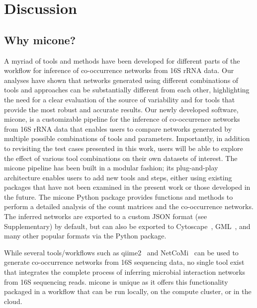 
\section*{Discussion}

  \subsection*{Why \ac{micone}?}

  A myriad of tools and methods have been developed for different parts of the workflow for inference of co-occurrence networks from 16S rRNA data.
  Our analyses have shown that networks generated using different combinations of tools and approaches can be substantially different from each other, highlighting the need for a clear evaluation of the source of variability and for tools that provide the most robust and accurate results.
  Our newly developed software, \ac{micone}, is a customizable pipeline for the inference of co-occurrence networks from 16S rRNA data that enables users to compare networks generated by multiple possible combinations of tools and parameters.
  Importantly, in addition to revisiting the test cases presented in this work, users will be able to explore the effect of various tool combinations on their own datasets of interest.
  The \ac{micone} pipeline has been built in a modular fashion; its plug-and-play architecture enables users to add new tools and steps, either using existing packages that have not been examined in the present work or those developed in the future.
  The \ac{micone} Python package provides functions and methods to perform a detailed analysis of the count matrices and the co-occurrence networks.
  The inferred networks are exported to a custom JSON format (see Supplementary) by default, but can also be exported to Cytoscape~\cite{shannonCytoscapeSoftwareEnvironment2003}, GML~\cite{himsoltGMLPortableGraph2010}, and many other popular formats via the Python package.

  While several tools/workflows such as \ac{qiime2}~\cite{bolyenReproducibleInteractiveScalable2019} and NetCoMi~\cite{peschelNetCoMiNetworkConstruction2020} can be used to generate co-occurrence networks from 16S sequencing data, no single tool exist that integrates the complete process of inferring microbial interaction networks from 16S sequencing reads.
  \ac{micone} is unique as it offers this functionality packaged in a workflow that can be run locally, on the compute cluster, or in the cloud.

